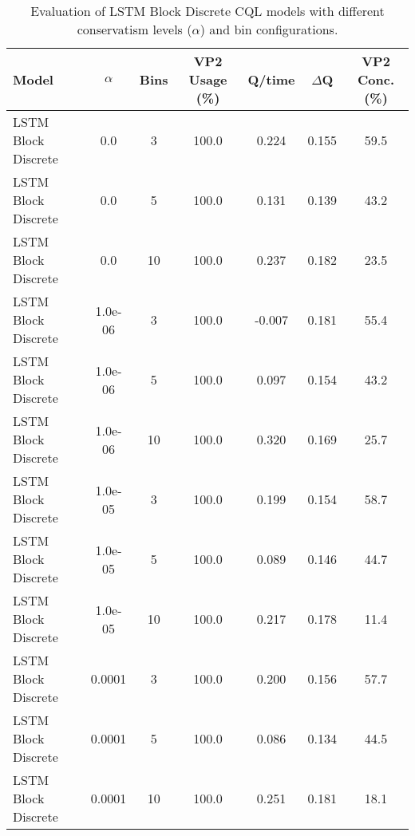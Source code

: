\begin{table}[ht]
\centering
\caption{Evaluation of LSTM Block Discrete CQL models with different conservatism levels ($\alpha$) and bin configurations.}
\label{tab:lstm_cql_evaluation}
\begin{tabular}{lcccccc}
\toprule
Model & $\alpha$ & Bins & VP2 Usage (\%) & Q/time & $\Delta$Q & VP2 Conc. (\%) \\
\midrule
LSTM Block Discrete & 0.0 & 3 & 100.0 & 0.224 & 0.155 & 59.5 \\
LSTM Block Discrete & 0.0 & 5 & 100.0 & 0.131 & 0.139 & 43.2 \\
LSTM Block Discrete & 0.0 & 10 & 100.0 & 0.237 & 0.182 & 23.5 \\
LSTM Block Discrete & 1.0e-06 & 3 & 100.0 & -0.007 & 0.181 & 55.4 \\
LSTM Block Discrete & 1.0e-06 & 5 & 100.0 & 0.097 & 0.154 & 43.2 \\
LSTM Block Discrete & 1.0e-06 & 10 & 100.0 & 0.320 & 0.169 & 25.7 \\
LSTM Block Discrete & 1.0e-05 & 3 & 100.0 & 0.199 & 0.154 & 58.7 \\
LSTM Block Discrete & 1.0e-05 & 5 & 100.0 & 0.089 & 0.146 & 44.7 \\
LSTM Block Discrete & 1.0e-05 & 10 & 100.0 & 0.217 & 0.178 & 11.4 \\
LSTM Block Discrete & 0.0001 & 3 & 100.0 & 0.200 & 0.156 & 57.7 \\
LSTM Block Discrete & 0.0001 & 5 & 100.0 & 0.086 & 0.134 & 44.5 \\
LSTM Block Discrete & 0.0001 & 10 & 100.0 & 0.251 & 0.181 & 18.1 \\
\bottomrule
\end{tabular}
\end{table}